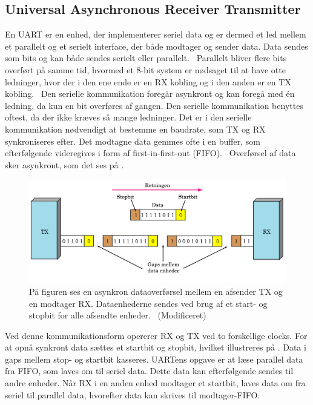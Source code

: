 \subsection{Universal Asynchronous Receiver Transmitter}
En UART er en enhed, der implementerer seriel data og er dermed et led mellem et parallelt og et serielt interface, der både modtager og sender data. Data sendes som bits og kan både sendes serielt eller parallelt.~\citep{Jimb02016a,Chun-zhiYin-shuiLun-yao2011} Parallelt bliver flere bits overført på samme tid, hvormed et 8-bit system er nødsaget til at have otte ledninger, hvor der i den ene ende er en RX kobling og i den anden er en TX kobling.~\citep{Jimb02016a} Den serielle kommunikation foregår asynkront og kan foregå med én ledning, da kun en bit overføres af gangen. Den serielle kommunikation benyttes oftest, da der ikke kræves så mange ledninger. Det er i den serielle kommunikation nødvendigt at bestemme en baudrate, som TX og RX synkroniseres efter. Det modtagne data gemmes ofte i en buffer, som efterfølgende videregives i form af first-in-first-out (FIFO).~\citep{Jimb02016a}\newline 
Overførsel af data sker asynkront, som det ses på .
\begin{figure}[H]
	\centering
	\includegraphics[scale=0.5]{figures/bProblemloesning/asynkron.png}
	\caption{På figuren ses en asynkron dataoverførsel mellem en afsender TX og en modtager RX. Dataenhederne sendes ved brug af et start- og stopbit for alle afsendte enheder.~\citep{Jimb02016} (Modificeret)}
	\label{fig:asynkron}
\end{figure}\vspace{-0.25cm}
Ved denne kommunikationsform opererer RX og TX ved to forskellige clocks. For at opnå synkront data sættes et startbit og stopbit, hvilket illustreres på . Data i gaps mellem stop- og startbit kasseres. UARTens opgave er at læse parallel data fra FIFO, som laves om til seriel data. Dette data kan efterfølgende sendes til andre enheder. Når RX i en anden enhed modtager et startbit, laves data om fra seriel til parallel data, hvorefter data kan skrives til modtager-FIFO.~\citep{Jimb02016a,Chun-zhiYin-shuiLun-yao2011}


